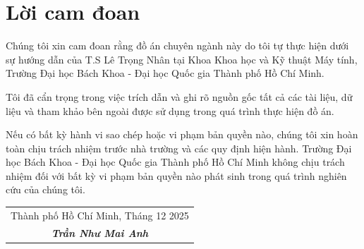 \chapter*{Lời cam đoan}

Chúng tôi xin cam đoan rằng đồ án chuyên ngành này do tôi tự thực hiện dưới sự hướng dẫn của T.S Lê Trọng Nhân tại Khoa Khoa học và Kỹ thuật Máy tính, Trường Đại học Bách Khoa - Đại học Quốc gia Thành phố Hồ Chí Minh.


Tôi đã cẩn trọng trong việc trích dẫn và ghi rõ nguồn gốc tất cả các tài liệu, dữ liệu và tham khảo bên ngoài được sử dụng trong quá trình thực hiện đồ án.


Nếu có bất kỳ hành vi sao chép hoặc vi phạm bản quyền nào, chúng tôi xin hoàn toàn chịu trách nhiệm trước nhà trường và các quy định hiện hành. Trường Đại học Bách Khoa - Đại học Quốc gia Thành phố Hồ Chí Minh không chịu trách nhiệm đối với bất kỳ vi phạm bản quyền nào phát sinh trong quá trình nghiên cứu của chúng tôi.
\vspace{2cm}

\begin{flushright}
\begin{tabular}{c}
    Thành phố Hồ Chí Minh, Tháng 12 2025 \\
    \textit{\textbf{Trần Như Mai Anh}} 
    
\end{tabular}
\end{flushright}